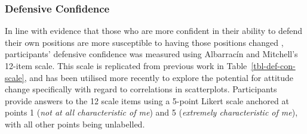 \documentclass[../main.tex]{subfiles}
\begin{document}
\subsubsection{Defensive Confidence}\label{def-con-e5}

In line with evidence that those who are more confident in their ability
to defend their own positions are more susceptible to having those
positions changed \cite{albarracin_2004}, participants' defensive
confidence was measured using Albarracín and Mitchell's
\cite{albarracin_2004} 12-item scale. This scale is replicated from
previous work in Table~\ref{tbl-def-con-scale}, and has been utilised
more recently \cite{markant_2023} to explore the potential for attitude
change specifically with regard to correlations in scatterplots.
Participants provide answers to the 12 scale items using a 5-point
Likert scale anchored at points 1 (\emph{not at all characteristic of
me}) and 5 (\emph{extremely characteristic of me}), with all other
points being unlabelled.
\end{document}
